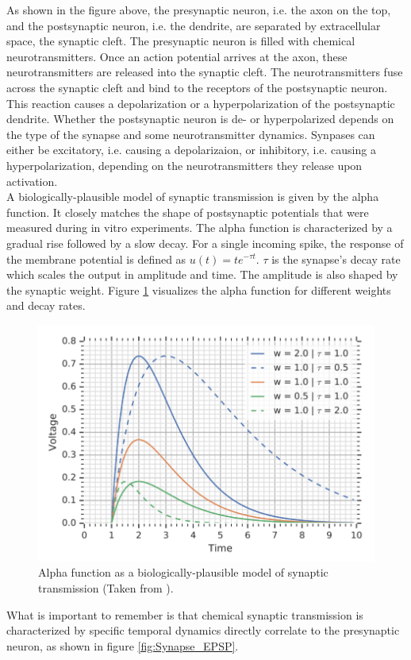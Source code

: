 As shown in the figure above, the presynaptic neuron, i.e. the axon on the top, and the postsynaptic neuron, i.e. the dendrite, are separated by extracellular space, the synaptic cleft. The presynaptic neuron is filled with chemical neurotransmitters. Once an action potential arrives at the axon, these neurotransmitters are released into the synaptic cleft. The neurotransmitters fuse across the synaptic cleft and bind to the receptors of the postsynaptic neuron. This reaction causes a depolarization or a hyperpolarization of the postsynaptic dendrite. Whether the postsynaptic neuron is de- or hyperpolarized depends on the type of the synapse and some neurotransmitter dynamics. Synpases can either be excitatory, i.e. causing a depolarizaion, or inhibitory, i.e. causing a hyperpolarization, depending on the neurotransmitters they release upon activation.\\

A biologically-plausible model of synaptic transmission is given by the alpha function. It closely matches the shape of postsynaptic potentials that were measured during in vitro experiments. The alpha function is characterized by a gradual rise followed by a slow decay. For a single incoming spike, the response of the membrane potential is defined as $u(t) = te^{-\tau t}$. $\tau$ is the synapse's decay rate which scales the output in amplitude and time. The amplitude is also shaped by the synaptic weight. Figure \ref{fig:alpha_function} visualizes the alpha function for different weights and decay rates.

\begin{figure}
 \centering
 \includegraphics[width=.6\linewidth]{Figures/alpha_function.PNG}
 \caption{Alpha function as a biologically-plausible model of synaptic transmission (Taken from \cite{comsa_temporal_2020}).}
 \label{fig:alpha_function}
\end{figure}


What is important to remember is that chemical synaptic transmission is characterized by specific temporal dynamics directly correlate to the presynaptic neuron, as shown in figure \ref{fig:Synapse_EPSP}.

